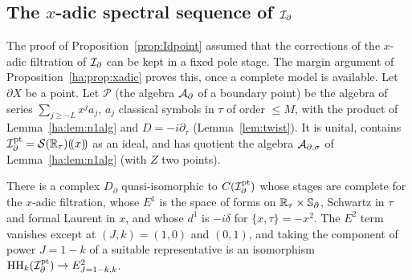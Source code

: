 \subsection{The \texorpdfstring{\(x\)}{x}-adic spectral sequence of
\texorpdfstring{\(\mathcal I_\partial\)}{Id}}\label{ha:subsec:Id}

The proof of Proposition~\ref{prop:Idpoint} assumed that the corrections
of the \(x\)-adic filtration of \(\mathcal I_\partial\) can be kept in a fixed pole stage.
The margin argument of Proposition~\ref{ha:prop:xadic} proves this, once
a complete model is available. Let \(\partial X\) be a point. Let
\(\mathcal P\) (the algebra \(\mathcal A_\partial\) of a boundary point) be the algebra of series \(\sum_{j\ge-L}x^ja_j\),
\(a_j\) classical symbols in \(\tau\) of order \(\le M\), with the
product of Lemma~\ref{ha:lem:n1alg} and \(D=-i\partial_\tau\)
(Lemma~\ref{lem:twist}). It is unital, contains
\(\mathcal I_\partial^{\mathrm{pt}}=\mathcal S(\mathbb R_\tau)(\!(x)\!)\) as an ideal, and has quotient
the algebra \(\mathcal A_{\partial,\sigma}\) of Lemma~\ref{ha:lem:n1alg} (with \(Z\) two points).

\begin{proposition}\label{ha:prop:Idconv}
There is a complex \(D_\partial\) quasi-isomorphic to \(C(\mathcal I_\partial^{\mathrm
{pt}})\) whose stages are complete for the \(x\)-adic filtration, whose
\(E^1\) is the space of forms on \(\mathbb R_\tau\times\mathbb S_\partial\), Schwartz in
\(\tau\) and formal Laurent in \(x\), and whose \(d^1\) is \(-i\delta\)
for \(\{x,\tau\}=-x^2\). The \(E^2\) term vanishes except at
\((J,k)=(1,0)\) and \((0,1)\), and taking the component of power
\(J=1-k\) of a suitable representative is an isomorphism
\(\operatorname{HH}_k(\mathcal I_\partial^{\mathrm{pt}})\to E^2_{J=1-k,k}\).
\end{proposition}

